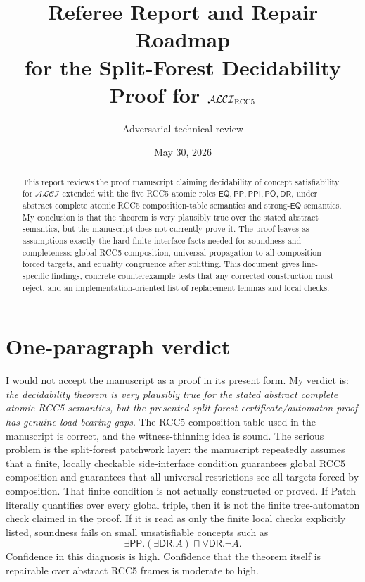 \documentclass[11pt]{article}
\title{Referee Report and Repair Roadmap\\
for the Split-Forest Decidability Proof for $\ALCI_{\RCC}$}
\author{Adversarial technical review}
\date{May 30, 2026}
\newcommand{\ALCI}{\mathcal{ALCI}}
\newcommand{\EQ}{\mathsf{EQ}}
\newcommand{\PP}{\mathsf{PP}}
\newcommand{\PPI}{\mathsf{PPI}}
\newcommand{\PO}{\mathsf{PO}}
\newcommand{\DR}{\mathsf{DR}}
\begin{document}
\maketitle

\begin{abstract}
This report reviews the proof manuscript claiming decidability of concept satisfiability for $\ALCI$ extended with the five RCC5 atomic roles $\EQ,\PP,\PPI,\PO,\DR$, under abstract complete atomic RCC5 composition-table semantics and strong-$\EQ$ semantics.  My conclusion is that the theorem is very plausibly true over the stated abstract semantics, but the manuscript does not currently prove it.  The proof leaves as assumptions exactly the hard finite-interface facts needed for soundness and completeness: global RCC5 composition, universal propagation to all composition-forced targets, and equality congruence after splitting.  This document gives line-specific findings, concrete counterexample tests that any corrected construction must reject, and an implementation-oriented list of replacement lemmas and local checks.
\end{abstract}

\tableofcontents

\section{One-paragraph verdict}

I would not accept the manuscript as a proof in its present form.  My verdict is: \emph{the decidability theorem is very plausibly true for the stated abstract complete atomic RCC5 semantics, but the presented split-forest certificate/automaton proof has genuine load-bearing gaps}.  The RCC5 composition table used in the manuscript is correct, and the witness-thinning idea is sound.  The serious problem is the split-forest patchwork layer: the manuscript repeatedly assumes that a finite, locally checkable side-interface condition guarantees global RCC5 composition and guarantees that all universal restrictions see all targets forced by composition.  That finite condition is not actually constructed or proved.  If \textsf{Patch} literally quantifies over every global triple, then it is not the finite tree-automaton check claimed in the proof.  If it is read as only the finite local checks explicitly listed, soundness fails on small unsatisfiable concepts such as
\[
  \exists\PP.(\exists\DR.A) \sqcap \forall\DR.\neg A .
\]
Confidence in this diagnosis is high.  Confidence that the theorem itself is repairable over abstract RCC5 frames is moderate to high.
\end{document}
